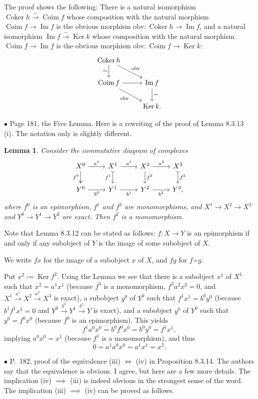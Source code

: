 \documentclass[12pt]{article}
\newtheorem{lem}[thm]{Lemma}
\theoremstyle{remark}%
\newcommand{\bu}{\bullet}
\newcommand{\n}{\noindent}
\newcommand{\pf}{\n{\em Proof. }}
\newcommand{\bl}{\begin{lem}}
\newcommand{\el}{\end{lem}}
\DeclareMathOperator{\Coim}{Coim}
\DeclareMathOperator{\Coker}{Coker}
\DeclareMathOperator{\Ima}{Im}
\DeclareMathOperator{\Ker}{Ker}
\begin{document}
The proof shows the following: There is a natural isomorphism $\Coker h\xrightarrow{\sim}\Coim f$ whose composition with the natural morphism $\Coim f\to\Ima f$ is the obvious morphism $\text{obv}:\Coker h\to\Ima f$, and a natural isomorphism $\Ima f\xrightarrow{\sim}\Ker k$ whose composition with the natural morphism $\Coim f\to\Ima f$ is the obvious morphism $\text{obv}:\Coim f\to\Ker k$: 
$$
\begin{tikzcd}
\Coker h\ar{d}[swap]{\sim}\ar{dr}{\text{obv}}\\
\Coim f\ar{r}\ar{dr}[swap]{\text{obv}}&\Ima f\ar{d}{\sim}\\
&\Ker k.
\end{tikzcd}
$$


\n$\bu$ Page 181, the Five Lemma. Here is a rewriting of the proof of Lemma 8.3.13 (i). The notation only is slightly different. 
%
\bl 
Consider the commutative diagram of complexes 
$$
\begin{tikzcd}
X^0\arrow[two heads]{d}[swap]{f^0}\arrow{r}{a^0}&
X^1\arrow[tail]{d}[swap]{f^1}\arrow{r}{a^1}&
X^2\arrow{d}{f^2}\arrow{r}{a^2}&
X^3\arrow[tail]{d}{f^3}\\ 
Y^0\arrow{r}[swap]{b^0}&
Y^1\arrow{r}[swap]{b^1}&
Y^2\arrow{r}[swap]{b^2}&
Y^3,
\end{tikzcd}
$$
where $f^0$ is an epimorphism, $f^1$ and $f^3$ are monomorphisms, and $X^1\to X^2\to X^3$ and $Y^0\to Y^1\to Y^2$ are exact. Then $f^2$ is a monomorphism. 
\el 
% 
\pf Note that Lemma 8.3.12 can be stated as follows: $f:X\to Y$ is an epimorphism if and only if any subobject of $Y$ is the image of some subobject of $X$. 

We write $fx$ for the image of a subobject $x$ of $X$, and $fg$ for $f\circ g$.

Put $x^2:=\Ker f^2$. Using the Lemma we see that there is a subobject $x^1$ of $X^1$ such that $x^2=a^1x^1$ (because $f^3$ is a monomorphism, $f^3a^2x^2=0$, and $X^1\overset{a^1}{\to}X^2\overset{a^2}{\to}X^3$ is exact), a subobject $y^0$ of $Y^0$ such that $f^1x^1=b^0y^0$ (because $b^1f^1x^1=0$ and $Y^0\overset{b^0}{\to}Y^1\overset{b^1}{\to}Y$ is exact), and a subobject $y^0$ of $Y^0$ such that $y^0=f^0x^0$ (because $f^0$ is an epimorphism). This yields  
$$
f^1a^0x^0=b^0f^0x^0=b^0y^0=f^1x^1,
$$
implying $a^0x^0=x^1$ (because $f^1$ is a monomorphism), and thus 
$$
0=a^1a^0x^0=a^1x^1=x^2.
$$ 


\n$\bu$ P.~182, proof of the equivalence (iii) $\iff$ (iv) in Proposition 8.3.14. The authors say that the equivalence is obvious. I agree, but here are a few more details. The implication (iv) $\implies$ (iii) is indeed obvious in the strongest sense of the word. The implication (iii) $\implies$ (iv) can be proved as follows. 
\end{document}

